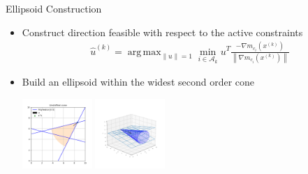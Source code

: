 \documentclass{beamer}
\newcommand{\xk}{{{x}^{(k)}}}
\DeclareMathOperator*{\argmax}{arg\,max}
\begin{document}
\begin{frame}{Ellipsoid Construction}
	\begin{itemize}
		\item Construct direction feasible with respect to the active constraints \\
			\begin{align*}
				\hat u^{(k)} = \argmax_{\|u\| = 1} \min_{i \in \mathcal A_k} u^T \frac{-\nabla m_{c_i}\left(\xk\right)}{\left\|\nabla m_{c_i}\left(\xk\right)\right\|}
			\end{align*}
		\item Build an ellipsoid within the widest second order cone
		\begin{center}
			\includegraphics[width=100px]{images/unshifted_cone.png}
			\includegraphics[width=100px]{images/second_order_cone.png}
		\end{center}
	\end{itemize}
\end{frame}
\end{document}
